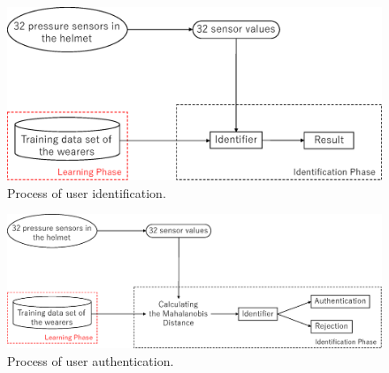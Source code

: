\documentclass[sigchi,authordraft]{acmart}
\newcommand\figref[1]{\textbf{Figure~\ref{fig:#1}}}
\begin{document}
\begin{figure}[!t]
  \centering
    \includegraphics[width=1\linewidth]{figure/system_classification.eps}
  \caption{Process of user identification.}
  \label{fig:system_classification}
\end{figure}

\begin{figure}[!t]
  \centering
    \includegraphics[width=1\linewidth]{figure/system_mahalanobis.eps}
  \caption{Process of user authentication.}
  \label{fig:system_mahalanobis}
\end{figure}


    
\end{document}
